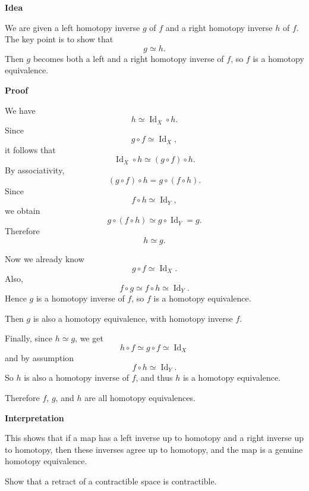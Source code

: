 \begin{solution}

\medskip
\noindent\textbf{Idea}\par
\smallskip


We are given a left homotopy inverse \(g\) of \(f\) and a right homotopy inverse \(h\) of \(f\).  
The key point is to show that
\[
g\simeq h.
\]
Then \(g\) becomes both a left and a right homotopy inverse of \(f\), so \(f\) is a homotopy equivalence.


\medskip
\noindent\textbf{Proof}\par
\smallskip


We have
\[
h \simeq \operatorname{Id}_X\circ h.
\]
Since
\[
g\circ f \simeq \operatorname{Id}_X,
\]
it follows that
\[
\operatorname{Id}_X\circ h \simeq (g\circ f)\circ h.
\]
By associativity,
\[
(g\circ f)\circ h = g\circ(f\circ h).
\]
Since
\[
f\circ h \simeq \operatorname{Id}_Y,
\]
we obtain
\[
g\circ(f\circ h)\simeq g\circ\operatorname{Id}_Y = g.
\]
Therefore
\[
h\simeq g.
\]

Now we already know
\[
g\circ f \simeq \operatorname{Id}_X.
\]
Also,
\[
f\circ g \simeq f\circ h \simeq \operatorname{Id}_Y.
\]
Hence \(g\) is a homotopy inverse of \(f\), so \(f\) is a homotopy equivalence.

Then \(g\) is also a homotopy equivalence, with homotopy inverse \(f\).

Finally, since \(h\simeq g\), we get
\[
h\circ f \simeq g\circ f \simeq \operatorname{Id}_X
\]
and by assumption
\[
f\circ h \simeq \operatorname{Id}_Y.
\]
So \(h\) is also a homotopy inverse of \(f\), and thus \(h\) is a homotopy equivalence.

Therefore \(f\), \(g\), and \(h\) are all homotopy equivalences.


\medskip
\noindent\textbf{Interpretation}\par
\smallskip


This shows that if a map has a left inverse up to homotopy and a right inverse up to homotopy, then these inverses agree up to homotopy, and the map is a genuine homotopy equivalence.
\end{solution}

\begin{problem}
Show that a retract of a contractible space is contractible.
\end{problem}

